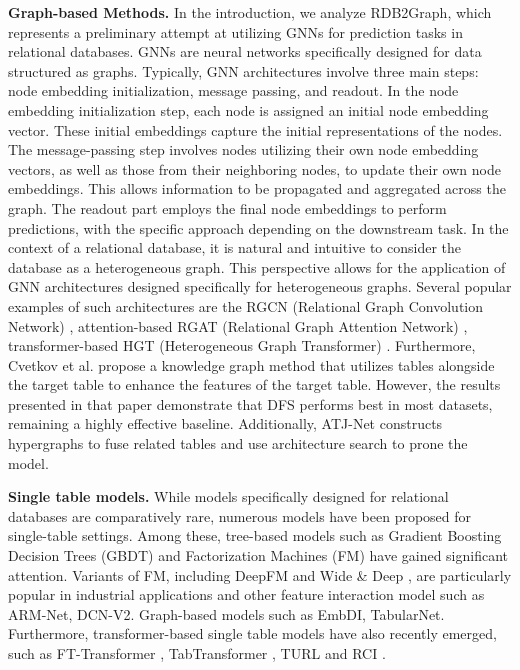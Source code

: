 \header
\textbf{Graph-based Methods.}
In the introduction, we analyze RDB2Graph, which represents a preliminary attempt at utilizing GNNs for prediction tasks in relational databases. GNNs are neural networks specifically designed for data structured as graphs. Typically, GNN architectures involve three main steps: node embedding initialization, message passing, and readout.
In the node embedding initialization step, each node is assigned an initial node embedding vector. These initial embeddings capture the initial representations of the nodes.
The message-passing step involves nodes utilizing their own node embedding vectors, as well as those from their neighboring nodes, to update their own node embeddings. This allows information to be propagated and aggregated across the graph.
The readout part employs the final node embeddings to perform predictions, with the specific approach depending on the downstream task.
In the context of a relational database, it is natural and intuitive to consider the database as a heterogeneous graph. This perspective allows for the application of GNN architectures designed specifically for heterogeneous graphs. Several popular examples of such architectures are the RGCN (Relational Graph Convolution Network) \cite{schlichtkrull2018modeling}, attention-based RGAT (Relational Graph Attention Network) \cite{busbridge2019relational}, transformer-based HGT (Heterogeneous Graph Transformer) \cite{hu2020heterogeneous}. 
Furthermore, Cvetkov et al. \cite{cvetkov2023relational} propose a knowledge graph method that utilizes tables alongside the target table to enhance the features of the target table. However, the results presented in that paper demonstrate that DFS performs best in most datasets, remaining a highly effective baseline. Additionally, ATJ-Net\cite{bai2021atj} constructs hypergraphs to fuse related tables and use architecture search to prone the model.

\header
\textbf{Single table models.}
While models specifically designed for relational databases are comparatively rare, numerous models have been proposed for single-table settings. Among these, tree-based models such as Gradient Boosting Decision Trees (GBDT) \cite{friedman2001greedy} and Factorization Machines (FM) \cite{rendle2010factorization} have gained significant attention. Variants of FM, including DeepFM \cite{guo2017deepfm} and Wide \& Deep \cite{cheng2016wide}, are particularly popular in industrial applications and other feature interaction model such as ARM-Net\cite{cai2021arm}, DCN-V2\cite{wang2021dcn}. Graph-based models such as EmbDI\cite{create2020}, TabularNet\cite{du2021tabularnet}. Furthermore, transformer-based single table models have also recently emerged, such as FT-Transformer \cite{gorishniy2021revisiting}, TabTransformer \cite{huang2020tabtransformer}, TURL \cite{deng2022turl} and RCI \cite{glass2021capturing}.

